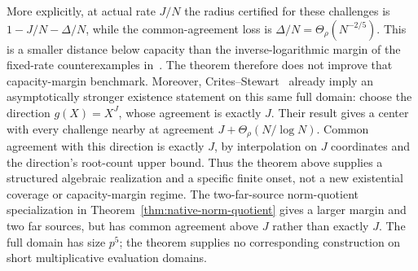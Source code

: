 More explicitly, at actual rate $J/N$ the radius certified for these
challenges is $1-J/N-\Delta/N$, while the common-agreement loss is
$\Delta/N=\Theta_\rho(N^{-2/5})$. This is a smaller distance below
capacity than the inverse-logarithmic margin of the fixed-rate
counterexamples in~\cite[Theorem~1]{kkh}. The theorem therefore does
not improve that capacity-margin benchmark. Moreover,
Crites--Stewart~\cite[Corollary~1]{crites-stewart2025} already imply
an asymptotically stronger existence statement on this same full domain:
choose the direction $g(X)=X^J$, whose agreement is exactly $J$.
Their result gives a center with every challenge nearby at agreement
$J+\Theta_\rho(N/\log N)$. Common agreement with this direction is
exactly $J$, by interpolation on $J$ coordinates and the direction's
root-count upper bound. Thus the theorem above supplies a structured
algebraic realization and a specific finite onset, not a new existential
coverage or capacity-margin regime.
The two-far-source norm-quotient specialization in
Theorem~\ref{thm:native-norm-quotient} gives a larger margin and two
far sources, but has common agreement above $J$ rather than exactly $J$.
The full domain has size $p^5$; the theorem supplies no corresponding
construction on short multiplicative evaluation domains.

